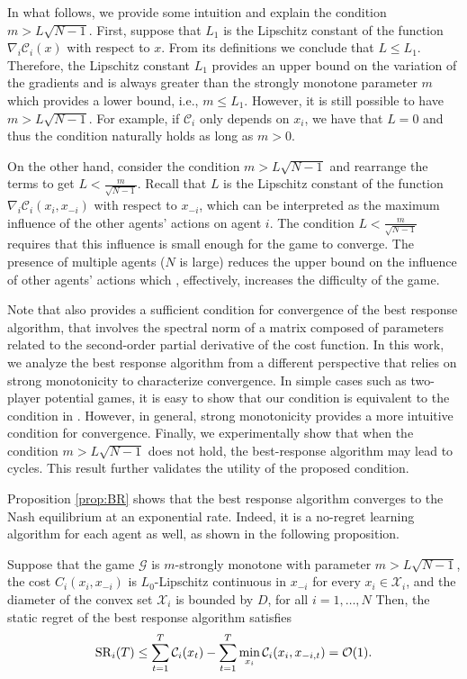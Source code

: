 %
In what follows, we provide some intuition and explain the condition $m>L \sqrt{N-1}$.
First, suppose that $L_1$ is the Lipschitz constant of the function $ \nabla_i \mathcal{C}_i(x)$ with respect to $x$. From its definitions we conclude that $L\leq L_1$. Therefore, the Lipschitz constant $L_1$ provides an upper bound on the variation of the gradients and is always greater than the strongly monotone parameter $m$ which provides a lower bound, i.e., $m\leq L_1$. However, it is still possible to have $m>L \sqrt{N-1} $. For example, if $\mathcal{C}_i$ only depends on $x_i$, we have that $L = 0$ and thus the condition naturally holds as long as $m>0$.

On the other hand, consider the condition $m>L\sqrt{N-1}$ and rearrange the terms to get $L<\frac{m}{ \sqrt{N-1}}$. Recall that $L$ is the Lipschitz constant of the function $\nabla_i \mathcal{C}_i(x_i,x_{-i})$ with respect to $x_{-i}$, which can be interpreted as the maximum influence of the other agents' actions on agent $i$. The condition $L<\frac{m}{ \sqrt{N-1}}$ requires that this influence is small enough for the game to converge.  The presence of multiple agents ($N$ is large) reduces the upper bound on the influence of other agents' actions which , effectively, increases the difficulty of the game.



Note that \cite{facchinei201012} also provides a sufficient condition for convergence of the best response algorithm, that involves the spectral norm of a matrix composed of parameters related to the second-order partial derivative of the cost function.
%
In this work, we analyze the best response algorithm from a different perspective that relies on strong monotonicity to characterize  convergence.
In simple cases such as two-player potential games, it is easy to show that our condition is equivalent to the condition in \cite{facchinei201012}.
However, in general, strong monotonicity  provides a more intuitive condition for convergence. Finally, we experimentally show that when the condition $m>L\sqrt{N-1}$ does not hold, the best-response algorithm may lead to cycles. This result further validates the utility of the proposed condition. 

Proposition \ref{prop:BR} shows that the best response algorithm converges to the Nash equilibrium at an exponential rate. Indeed, it is a no-regret learning algorithm for each agent as well, as shown in the following proposition.

\begin{proposition}\label{prop:BR:no_regret}
Suppose that the game $\mathcal{G}$ is $m$-strongly monotone with parameter $m>L \sqrt{N-1}$, the cost $C_i(x_i,x_{-i})$ is $L_0$-Lipschitz continuous in $x_{-i}$ for every $x_i \in \mathcal{X}_i$, and the diameter of the convex set $\mathcal{X}_i$ is bounded by $D$, for all $i=1,\ldots,N$ Then, the static regret of the best response algorithm satisfies
\begin{align*}
    {\rm{SR}}_i(T) \leq  \sum_{t=1}^T \mathcal{C}_i(x_t) -  \sum_{t=1}^T \min_{x_i}\mathcal{C}_i(x_i,x_{-i,t}) = \mathcal{O}(1).
\end{align*}
\end{proposition}

